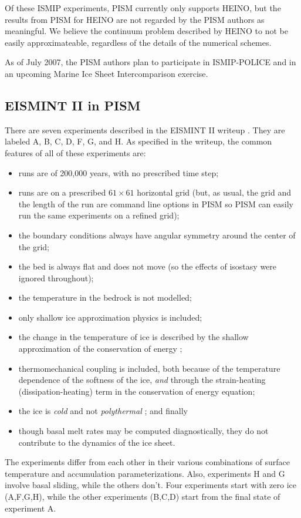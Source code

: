 \documentclass[11pt,final]{amsart}
\begin{document}
Of these ISMIP experiments, PISM currently only supports HEINO, but the results from PISM for HEINO are not regarded by the PISM authors as meaningful.  We believe the continuum problem described by HEINO to not be easily approximateable, regardless of the details of the numerical schemes.

As of July 2007, the PISM authors plan to participate in ISMIP-POLICE and in an upcoming Marine Ice Sheet Intercomparison exercise.

\subsection{EISMINT II in PISM}  There are seven experiments described in the EISMINT II writeup \cite{EISMINT00}. They are labeled A, B, C, D, F, G, and H.  As specified in the writeup, the common features of all of these experiments are:\begin{itemize}
\item runs are of 200,000 years, with no prescribed time step;
\item runs are on a prescribed $61\times 61$ horizontal grid (but, as usual, the grid and the length of the run are command line options in PISM so PISM can easily run the same experiments on a refined grid);
\item the boundary conditions always have angular symmetry around the center of the grid;
\item the bed is always flat and does not move (so the effects of isostasy were ignored throughout);
\item the temperature in the bedrock is not modelled;
\item only shallow ice approximation physics is included;
\item the change in the temperature of ice is described by the shallow approximation of the conservation of energy \cite{Fowler};
\item thermomechanical coupling is included, both because of the temperature dependence of the softness of the ice, \emph{and} through the strain-heating (dissipation-heating) term in the conservation of energy equation;
\item the ice is \emph{cold} and not \emph{polythermal} \cite{Greve}; and finally
\item though basal melt rates may be computed diagnostically, they do not contribute to the dynamics of the ice sheet.
\end{itemize}
The experiments differ from each other in their various combinations of surface temperature and accumulation parameterizations.  Also, experiments H and G involve basal sliding, while the others don't.  Four experiments start with zero ice (A,F,G,H), while the other experiments (B,C,D) start from the final state of experiment A.
\end{document}
